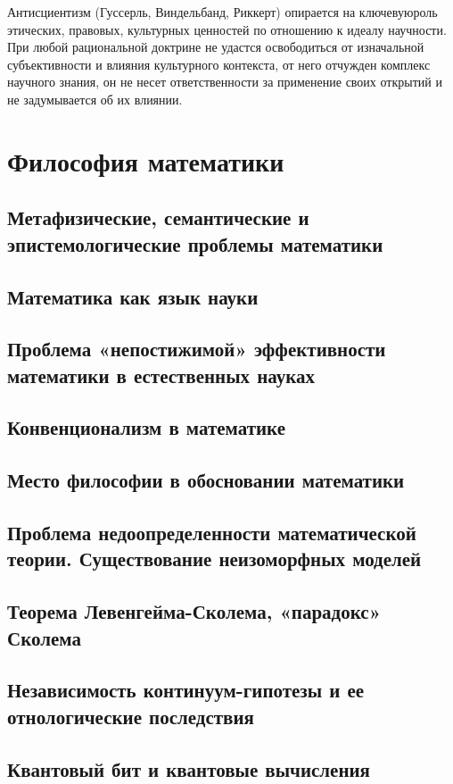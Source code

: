 \documentclass[12pt, specialist, subf, substylefile = spbu.rtx]{disser}
\begin{document}
Антисциентизм (Гуссерль, Виндельбанд, Риккерт) опирается на ключевуюроль этических, правовых, культурных ценностей по отношению к идеалу научности. При любой рациональной доктрине не удастся освободиться от изначальной субъективности и влияния культурного контекста, от него отчужден комплекс научного знания, он не несет ответственности за применение своих открытий и не задумывается об их влиянии.



\chapter{Философия математики}
\section{Метафизические, семантические и эпистемологические проблемы математики}
\section{Математика как язык науки}
\section{Проблема «непостижимой» эффективности математики в естественных науках}
\section{Конвенционализм в математике}
\section{Место философии в обосновании математики}
\section{Проблема недоопределенности математической теории. Существование неизоморфных моделей}
\section{Теорема Левенгейма-Сколема, «парадокс» Сколема}
\section{Независимость континуум-гипотезы и ее отнологические последствия}
\section{Квантовый бит и квантовые вычисления}
\end{document}
